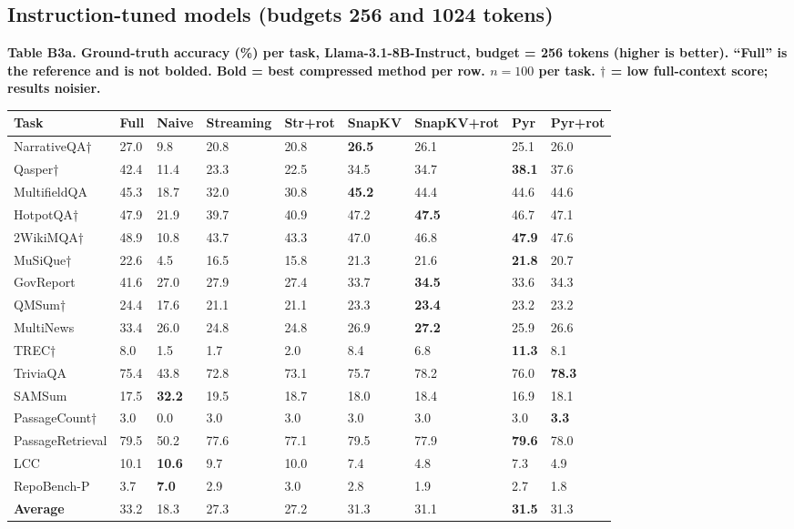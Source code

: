 \documentclass[10pt,letterpaper]{article}
\begin{document}
\clearpage
\subsection*{Instruction-tuned models (budgets 256 and 1024 tokens)}


\textbf{Table B3a. Ground-truth accuracy (\%) per task, Llama-3.1-8B-Instruct,
budget = 256 tokens (higher is better). ``Full'' is the reference and is not bolded.
Bold = best compressed method per row.
$n = 100$ per task. \(\dagger\) = low full-context score; results noisier.}

\begin{table}[H]
\centering
\small
\begin{tabular}{@{}lllllllll@{}}
\toprule
Task & Full & Naive & Streaming & Str+rot & SnapKV & SnapKV+rot & Pyr &
Pyr+rot\\
\midrule
NarrativeQA† & 27.0 & 9.8 & 20.8 & 20.8 & \textbf{26.5} & 26.1 & 25.1 &
26.0\\
Qasper† & 42.4 & 11.4 & 23.3 & 22.5 & 34.5 & 34.7 & \textbf{38.1} &
37.6\\
MultifieldQA & 45.3 & 18.7 & 32.0 & 30.8 & \textbf{45.2} & 44.4 & 44.6 &
44.6\\
HotpotQA† & 47.9 & 21.9 & 39.7 & 40.9 & 47.2 & \textbf{47.5} & 46.7 &
47.1\\
2WikiMQA† & 48.9 & 10.8 & 43.7 & 43.3 & 47.0 & 46.8 & \textbf{47.9} &
47.6\\
MuSiQue† & 22.6 & 4.5 & 16.5 & 15.8 & 21.3 & 21.6 & \textbf{21.8} &
20.7\\
GovReport & 41.6 & 27.0 & 27.9 & 27.4 & 33.7 & \textbf{34.5} & 33.6 &
34.3\\
QMSum† & 24.4 & 17.6 & 21.1 & 21.1 & 23.3 & \textbf{23.4} & 23.2 &
23.2\\
MultiNews & 33.4 & 26.0 & 24.8 & 24.8 & 26.9 & \textbf{27.2} & 25.9 &
26.6\\
TREC† & 8.0 & 1.5 & 1.7 & 2.0 & 8.4 & 6.8 & \textbf{11.3} &
8.1\\
TriviaQA & 75.4 & 43.8 & 72.8 & 73.1 & 75.7 & 78.2 & 76.0 &
\textbf{78.3}\\
SAMSum & 17.5 & \textbf{32.2} & 19.5 & 18.7 & 18.0 & 18.4 & 16.9 &
18.1\\
PassageCount† & 3.0 & 0.0 & 3.0 & 3.0 & 3.0 & 3.0 & 3.0 &
\textbf{3.3}\\
PassageRetrieval & 79.5 & 50.2 & 77.6 & 77.1 & 79.5 & 77.9 & \textbf{79.6} &
78.0\\
LCC & 10.1 & \textbf{10.6} & 9.7 & 10.0 & 7.4 & 4.8 & 7.3 &
4.9\\
RepoBench-P & 3.7 & \textbf{7.0} & 2.9 & 3.0 & 2.8 & 1.9 & 2.7 &
1.8\\
\textbf{Average} & 33.2 & 18.3 & 27.3 & 27.2 & 31.3 & 31.1 & \textbf{31.5} &
31.3\\
\bottomrule
\end{tabular}
\end{table}
\end{document}
